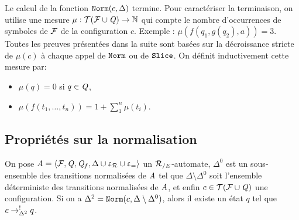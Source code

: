 \begin{remark}
  Le calcul de la fonction $\mathtt{Norm}(c, \Delta)$ termine. Pour caractériser la terminaison, on utilise
  une mesure $\mu : \mathcal{ T(F \cup \mathit Q)} \rightarrow \mathbb N$  qui compte le nombre d'occurrences de symboles de $\mathcal{F}$ de la configuration $c$.
  Exemple : $\mu(f(q_1, g(q_2), a)) = 3$. Toutes les preuves présentées dans la suite sont basées sur la décroissance
  stricte de $\mu(c)$ à chaque appel de $\mathtt{Norm}$ ou de $\mathtt{Slice}$.
  On définit inductivement cette mesure par:
  \begin{itemize}
  \item 
    $\mu(q) = 0$ si $q \in \mathit Q$,
  \item 
    $\mu(f(t_1,\dots, t_n)) = 1 + \sum_1^n \mu(t_i)$.
  \end{itemize}
\end{remark}


\subsection*{Propriétés sur la normalisation}

\begin{property}%
  \label{prop:norm_determinism}
  On pose  $\mathit A = \langle \mathcal{F}, \mathit Q, \mathit Q_f, \Delta \cup \upvarepsilon_{\mathcal R} \cup \upvarepsilon_{=}\rangle$ un ${\mathcal R_{/E}}$-automate,
  $\Delta^0$ est un sous-ensemble des transitions normalisées de $\mathit A$ tel que 
  $\Delta \setminus \Delta^0$ soit l'ensemble déterministe des transitions normalisées de $\mathit A$, et enfin $c \in \mathcal{ T(F \cup \mathit Q)}$
  une configuration. 
  Si on a $\Delta^2 = \mathtt{Norm}(c, \Delta \setminus \Delta^0)$,  alors il existe un état $q$ tel que  $c \rightarrow^!_{\Delta^2} q$.
\end{property}

